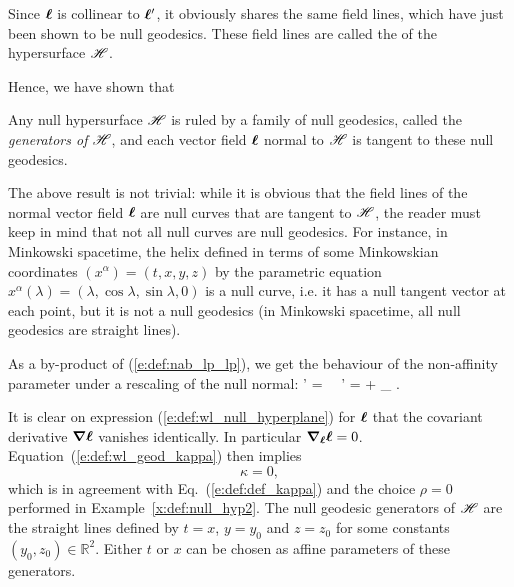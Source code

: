 Since $\bm{\ell}$ is collinear to $\bm{\ell}'$, it obviously shares the same field lines,
which have just been shown to be null geodesics. These field lines are called the
 of the hypersurface $\mathscr{H}$.

Hence, we have shown that
\begin{greybox}
Any null hypersurface $\mathscr{H}$ is ruled by a family of null geodesics, called the
\emph{generators of $\mathscr{H}$}, and each vector field $\bm{\ell}$ normal to $\mathscr{H}$ is
tangent to these null geodesics.
\end{greybox}

\begin{remark}
\label{r:def:null_curves}
The above result is not trivial: while it is obvious that the field lines of the normal
vector field $\bm{\ell}$ are null curves that are tangent to $\mathscr{H}$, the reader must
keep in mind that not all null curves are null geodesics. For instance, in
Minkowski spacetime, the helix defined in terms of
some Minkowskian coordinates $(x^\alpha)=(t,x,y,z)$ by the parametric equation
$x^\alpha(\lambda) = (\lambda, \cos\lambda, \sin\lambda, 0)$ is a null curve, i.e.
it has
a null tangent vector at each point, but it is not a null geodesics (in Minkowski
spacetime, all null geodesics are straight lines).
\end{remark}

As a by-product of (\ref{e:def:nab_lp_lp}), we get the behaviour of the
non-affinity parameter under a rescaling of the null normal:
\be \label{e:def:rescale_kappa}
    \wl' = \alpha \wl \ \Longrightarrow \ \kappa' = \alpha \kappa + \wnab_{\wl} \alpha .
\ee

\begin{example} \label{x:def:null_hyp3}
It is clear on expression (\ref{e:def:wl_null_hyperplane}) for $\bm{\ell}$ that
the covariant derivative
$\bm{\nabla} \bm{\ell}$ vanishes identically. In particular $\bm{\nabla}_{\bm{\ell}} \bm{\ell} = 0$.
Equation~(\ref{e:def:wl_geod_kappa}) then implies
\[
    \kappa = 0 ,
\]
which is in agreement with Eq.~(\ref{e:def:def_kappa}) and the choice $\rho=0$
performed in Example~\ref{x:def:null_hyp2}. The null geodesic generators of $\mathscr{H}$ are the
straight lines defined by $t=x$, $y=y_0$ and $z=z_0$ for some constants
$(y_0,z_0)\in \mathbb{R}^2$. Either $t$ or $x$ can be chosen as affine
parameters of these generators.
\end{example}

